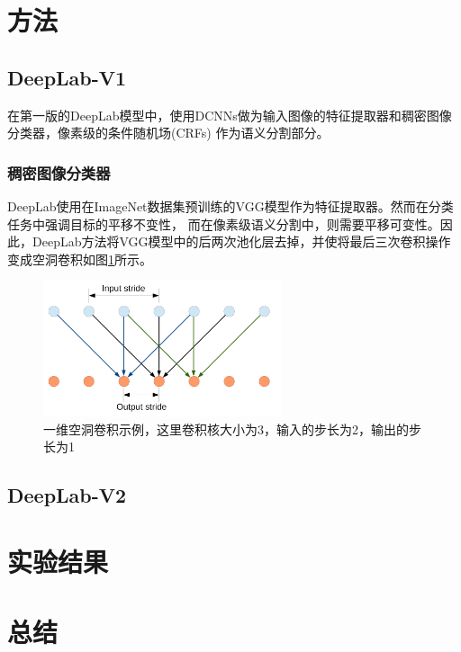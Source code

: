 \documentclass[10pt, a4paper]{article}
\begin{document}
\section{方法}
\subsection{DeepLab-V1}
在第一版的DeepLab模型中，使用DCNNs做为输入图像的特征提取器和稠密图像分类器，像素级的条件随机场(CRFs)\cite{CRF}
作为语义分割部分。
\subsubsection{稠密图像分类器}
DeepLab使用在ImageNet数据集预训练的VGG模型\cite{VGG}作为特征提取器。然而在分类任务中强调目标的平移不变性，
而在像素级语义分割中，则需要平移可变性。因此，DeepLab方法将VGG模型中的后两次池化层去掉，并使将最后三次卷积操作
变成空洞卷积如图\ref{p2}所示。

\begin{figure}[h]
    \centering
    \includegraphics[width=7cm]{p2.png}
    \caption{一维空洞卷积示例，这里卷积核大小为3，输入的步长为2，输出的步长为1}
    \label{p2}
\end{figure}


\subsection{DeepLab-V2}

\section{实验结果}

\section{总结}


\newpage
{}
\nocite{*}
\printbibliography[heading=bibliography,title=参考文献]
\end{document}
